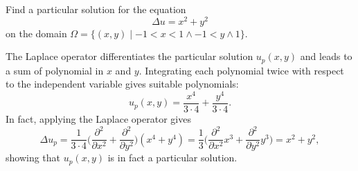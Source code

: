 Find a particular solution for the equation
\[
\Delta u = x^2 + y^2
\]
on the domain $\Omega = \{(x,y)\mid -1<x<1\wedge -1< y\wedge 1\}$.

\begin{loesung}
The Laplace operator differentiates the particular solution $u_p(x,y)$
and leads to a sum of polynomial in $x$ and $y$.
Integrating each polynomial twice with respect to the independent
variable gives suitable polynomials:
\[
u_p(x,y)
=
\frac{x^4}{3\cdot 4}
+
\frac{y^4}{3\cdot 4}.
\]
In fact, applying the Laplace operator gives
\[
\Delta u_p
=
\frac{1}{3\cdot 4}
\biggl(
\frac{\partial^2}{\partial x^2}
+
\frac{\partial^2}{\partial y^2}
\biggr)
(x^4+y^4)
=
\frac{1}{3}
\biggl(
\frac{\partial^2}{\partial x^2}
x^3
+
\frac{\partial^2}{\partial y^2}
y^3
\biggr)
=
x^2+y^2,
\]
showing that $u_p(x,y)$ is in fact a particular solution.
\end{loesung}


